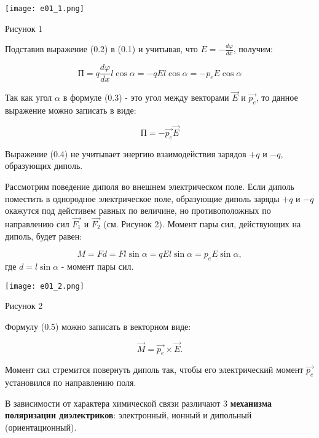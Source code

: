 \documentclass[__main__.tex]{subfiles}
\begin{document}
\begin{center}
	
	\texttt{[image: e01\_1.png]}
	
	Рисунок 1
	
\end{center}

Подставив выражение (0.2) в (0.1) и учитывая, что $E = -\frac{d\varphi}{dx}$, получим:

\begin{equation}
\textit{П} = q\frac{d\varphi}{dx} l \cos \alpha = -qEl\cos \alpha = -p_e E \cos \alpha
\end{equation}

Так как угол $\alpha$ в формуле (0.3) - это угол между векторами $\vec{E}$ и $\vec{p_e}$, то данное выражение можно записать в виде:

\begin{equation}
\textit{П} = - \vec{p_e} \vec{E}
\end{equation}

Выражение (0.4) не учитывает энергию взаимодействия зарядов $+q$ и $-q$, образующих диполь.

Рассмотрим поведение диполя во внешнем электрическом поле. Если диполь поместить в однородное электрическое поле, образующие диполь заряды $+q$ и $-q$ окажутся под дейстивем равных по величине, но противоположных по направлению сил $\vec{F_1}$ и $\vec{F_2}$ (см. Рисунок 2).
Момент пары сил, действующих на диполь, будет равен:

\begin{equation}
M = Fd = Fl\sin \alpha = qEl\sin \alpha = p_e E \sin \alpha,
\end{equation}
где $d = l\sin \alpha$ - момент пары сил.

\begin{center}
	
	\texttt{[image: e01\_2.png]}
	
	Рисунок 2
	
\end{center}

Формулу (0.5) можно записать в векторном виде:

\begin{equation}
\vec{M} = \vec{p_e} \times \vec{E}.
\end{equation}

Момент сил стремится повернуть диполь так, чтобы его электрический момент $\vec{p_e}$ установился по направлению поля.

В зависимости от характера химической связи различают 3 \textbf{механизма поляризации диэлектриков}: электронный, ионный и дипольный (ориентационный).
\end{document}

